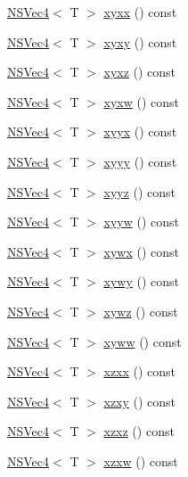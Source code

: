 \begin{DoxyCompactItemize}
\item 
\hyperlink{structNSVec4}{N\-S\-Vec4}$<$ T $>$ \hyperlink{structNSVec4_a366fd42330eaa2d254e7f175e0c42cc0}{xyxx} () const 
\item 
\hyperlink{structNSVec4}{N\-S\-Vec4}$<$ T $>$ \hyperlink{structNSVec4_a401043001565ae98dc4e01a0b985c344}{xyxy} () const 
\item 
\hyperlink{structNSVec4}{N\-S\-Vec4}$<$ T $>$ \hyperlink{structNSVec4_a50c22acdd1ff557b0cda93ed049b224c}{xyxz} () const 
\item 
\hyperlink{structNSVec4}{N\-S\-Vec4}$<$ T $>$ \hyperlink{structNSVec4_a0be31748405472fed28fcb7222fafca5}{xyxw} () const 
\item 
\hyperlink{structNSVec4}{N\-S\-Vec4}$<$ T $>$ \hyperlink{structNSVec4_adc18b2309f1907ba3832d0e303180a78}{xyyx} () const 
\item 
\hyperlink{structNSVec4}{N\-S\-Vec4}$<$ T $>$ \hyperlink{structNSVec4_adff73d4845484617b6a876f108d925e7}{xyyy} () const 
\item 
\hyperlink{structNSVec4}{N\-S\-Vec4}$<$ T $>$ \hyperlink{structNSVec4_a018d9ea1501fc318c88ec665d6a9b2f5}{xyyz} () const 
\item 
\hyperlink{structNSVec4}{N\-S\-Vec4}$<$ T $>$ \hyperlink{structNSVec4_ad516d847584c699147c4eb2b08bc4e5c}{xyyw} () const 
\item 
\hyperlink{structNSVec4}{N\-S\-Vec4}$<$ T $>$ \hyperlink{structNSVec4_adc4d61398e1a48196ba20f34d6ec5aa1}{xywx} () const 
\item 
\hyperlink{structNSVec4}{N\-S\-Vec4}$<$ T $>$ \hyperlink{structNSVec4_aa7430adf1c12aa5dd99ee938694c97d7}{xywy} () const 
\item 
\hyperlink{structNSVec4}{N\-S\-Vec4}$<$ T $>$ \hyperlink{structNSVec4_a183fafa0113144d2639641a2c059b6f6}{xywz} () const 
\item 
\hyperlink{structNSVec4}{N\-S\-Vec4}$<$ T $>$ \hyperlink{structNSVec4_a8c470d8a77e0892853f79e88735433e6}{xyww} () const 
\item 
\hyperlink{structNSVec4}{N\-S\-Vec4}$<$ T $>$ \hyperlink{structNSVec4_aa41e1c7ba0cf2d11e5f161813ff5dfd0}{xzxx} () const 
\item 
\hyperlink{structNSVec4}{N\-S\-Vec4}$<$ T $>$ \hyperlink{structNSVec4_a6e48b745d0b9d83f2eb0f89d54f81975}{xzxy} () const 
\item 
\hyperlink{structNSVec4}{N\-S\-Vec4}$<$ T $>$ \hyperlink{structNSVec4_a0e1df4cbd5bb99cb7402905d733e5caa}{xzxz} () const 
\item 
\hyperlink{structNSVec4}{N\-S\-Vec4}$<$ T $>$ \hyperlink{structNSVec4_ab88b9f832740bc691a0e74f62c6459c9}{xzxw} () const 

\end{DoxyCompactItemize}
